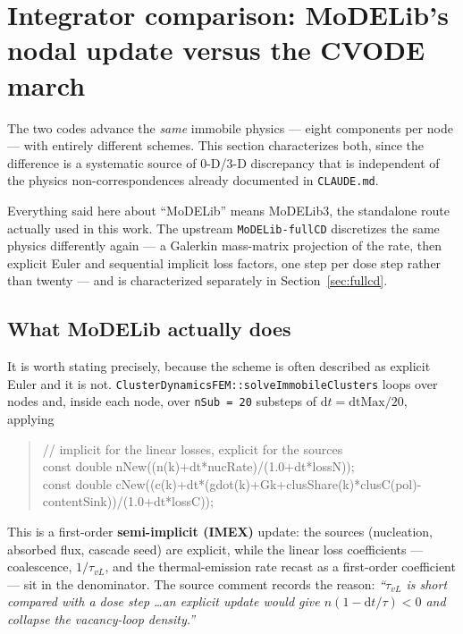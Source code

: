 \documentclass[11pt,a4paper]{article}
\newcommand{\code}[1]{\texttt{\small #1}}
\begin{document}
\section{Integrator comparison: MoDELib's nodal update versus the CVODE march}
\label{sec:integrators}

The two codes advance the \emph{same} immobile physics --- eight components per
node --- with entirely different schemes. This section characterizes both, since
the difference is a systematic source of 0-D/3-D discrepancy that is independent
of the physics non-correspondences already documented in \code{CLAUDE.md}.

Everything said here about ``MoDELib'' means MoDELib3, the standalone route
actually used in this work. The upstream \code{MoDELib-fullCD} discretizes the
same physics differently again --- a Galerkin mass-matrix projection of the rate,
then explicit Euler and sequential implicit loss factors, one step per dose step
rather than twenty --- and is characterized separately in
Section~\ref{sec:fullcd}.

\subsection{What MoDELib actually does}

It is worth stating precisely, because the scheme is often described as explicit
Euler and it is not. \code{ClusterDynamicsFEM::solveImmobileClusters} loops over
nodes and, inside each node, over \code{nSub = 20} substeps of
$\mathrm dt = \mathrm{dtMax}/20$, applying

\begin{quote}\small\ttfamily
// implicit for the linear losses, explicit for the sources\\
const double nNew((n(k)+dt*nucRate)/(1.0+dt*lossN));\\
const double cNew((c(k)+dt*(gdot(k)+Gk+clusShare(k)*clusC(pol)-contentSink))/(1.0+dt*lossC));
\end{quote}

This is a first-order \textbf{semi-implicit (IMEX)} update: the sources
(nucleation, absorbed flux, cascade seed) are explicit, while the linear loss
coefficients --- coalescence, $1/\tau_{vL}$, and the thermal-emission rate
recast as a first-order coefficient --- sit in the denominator. The source
comment records the reason: \emph{``$\tau_{vL}$ is short compared with a dose
step \ldots an explicit update would give $n(1-\mathrm dt/\tau)<0$ and collapse
the vacancy-loop density.''}
\end{document}
